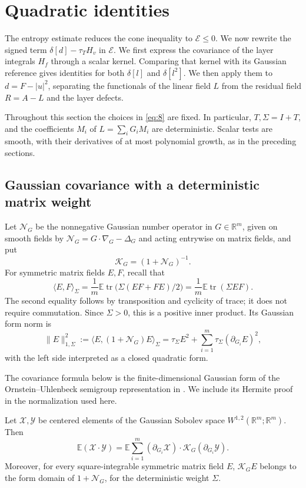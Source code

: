\section{Quadratic identities}\label{sec:04-quadratic}

The entropy estimate reduces the cone inequality to $\mathcal E\le0$.
We now rewrite the signed term $\delta[d]-\tau_T H_v$ in
$\mathcal E$. We first express the covariance of the layer integrals
$H_f$ through a scalar kernel. Comparing that kernel with its Gaussian
reference gives identities for both $\delta[l]$ and $\delta[l^2]$.
We then apply them to $d=F-|u|^2$, separating the functionals of the
linear field $L$ from the residual field $R=A-L$ and the layer defects.

Throughout this section the choices in \eqref{eq:8} are fixed.
In particular, \(T,\Sigma=I+T\), and the coefficients \(M_i\) of
\(L=\sum_iG_iM_i\) are deterministic. Scalar tests are smooth, with
their derivatives of at most polynomial growth, as in the preceding
sections.

\subsection{Gaussian covariance with a deterministic matrix weight}

Let \(\mathcal N_G\) be the nonnegative Gaussian number operator in
\(G\in\mathbb R^m\), given on smooth fields by
\(\mathcal N_G=G\cdot\nabla_G-\Delta_G\) and acting entrywise on
matrix fields, and put
\[
 \mathcal K_G=(1+\mathcal N_G)^{-1}.
\]
For symmetric matrix fields \(E,F\), recall that
\[
 \langle E,F\rangle_\Sigma
   =\frac1m\mathbb E\operatorname{tr}\bigl(\Sigma(EF+FE)/2\bigr)
   =\frac1m\mathbb E\operatorname{tr}(\Sigma EF).
\]
The second equality follows by transposition and cyclicity of trace;
it does not require commutation. Since \(\Sigma>0\), this is a
positive inner product. Its Gaussian form norm is
\[
 \|E\|_{1,\Sigma}^2
   :=\langle E,(1+\mathcal N_G)E\rangle_\Sigma
    =\tau_\Sigma E^2+
       \sum_{i=1}^m\tau_\Sigma(\partial_{G_i}E)^2,
\]
with the left side interpreted as a closed quadratic form.

The covariance formula below is the finite-dimensional Gaussian form of
the Ornstein--Uhlenbeck semigroup representation in
\cite[Proposition~2.1, Equation~(2.4)]{HoudrePrivault2002}.
We include its Hermite proof in the normalization used here.

\begin{lemma}\label{lem:gaussian-covariance}
 Let \(\mathcal X,\mathcal Y\) be centered elements of the Gaussian
 Sobolev space \(W^{1,2}(\mathbb R^m;\mathbb R^m)\). Then
 \[
  \mathbb E(\mathcal X\cdot\mathcal Y)
    =\mathbb E\sum_{i=1}^m
       (\partial_{G_i}\mathcal X)\cdot
       \mathcal K_G(\partial_{G_i}\mathcal Y).
 \]
 Moreover, for every square-integrable symmetric matrix field \(E\),
 \(\mathcal K_GE\) belongs to the form domain of
 \(1+\mathcal N_G\), for the deterministic weight \(\Sigma\).
\end{lemma}


